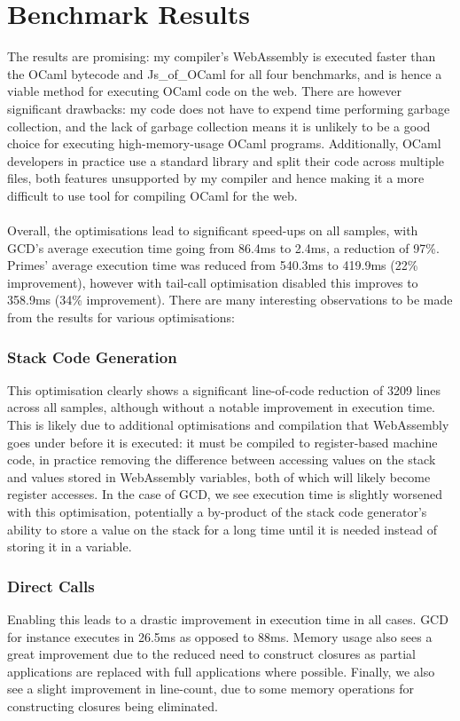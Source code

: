 \section{Benchmark Results}
The results are promising: my compiler's WebAssembly is executed faster than the OCaml bytecode and Js\_of\_OCaml for all four benchmarks, and is hence a viable method for executing OCaml code on the web. There are however significant drawbacks: my code does not have to expend time performing garbage collection, and the lack of garbage collection means it is unlikely to be a good choice for executing high-memory-usage OCaml programs. Additionally, OCaml developers in practice use a standard library and split their code across multiple files, both features unsupported by my compiler and hence making it a more difficult to use tool for compiling OCaml for the web.
\\\\
Overall, the optimisations lead to significant speed-ups on all samples, with GCD's average execution time going from 86.4ms to 2.4ms, a reduction of 97\%. Primes' average execution time was reduced from 540.3ms to 419.9ms (22\% improvement), however with tail-call optimisation disabled this improves to 358.9ms (34\% improvement). There are many interesting observations to be made from the results for various optimisations:

\subsubsection{Stack Code Generation}
This optimisation clearly shows a significant line-of-code reduction of 3209 lines across all samples, although without a notable improvement in execution time. This is likely due to additional optimisations and compilation that WebAssembly goes under before it is executed: it must be compiled to register-based machine code, in practice removing the difference between accessing values on the stack and values stored in WebAssembly variables, both of which will likely become register accesses. In the case of GCD, we see execution time is slightly worsened with this optimisation, potentially a by-product of the stack code generator's ability to store a value on the stack for a long time until it is needed instead of storing it in a variable.

\subsubsection{Direct Calls}
Enabling this leads to a drastic improvement in execution time in all cases. GCD for instance executes in 26.5ms as opposed to 88ms. Memory usage also sees a great improvement due to the reduced need to construct closures as partial applications are replaced with full applications where possible. Finally, we also see a slight improvement in line-count, due to some memory operations for constructing closures being eliminated.

